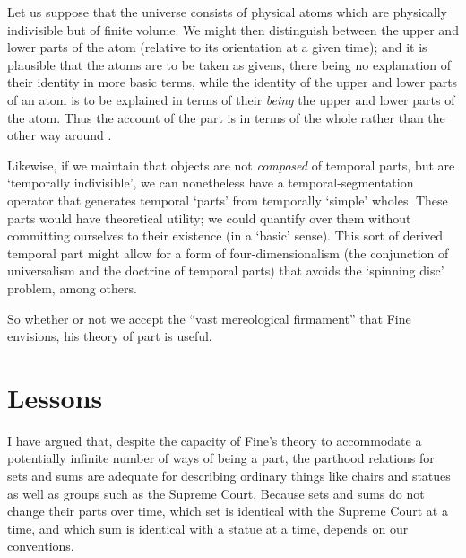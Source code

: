 \documentclass[11pt]{article}
\newenvironment{squote}{%
\begin{spacing}{1}
\begin{list}{}{%
\setlength{\labelwidth}{0pt}%
\rightmargin\leftmargin%
}
\item\relax
}{%
\end{list}%
\end{spacing}
}
\begin{document}
\begin{spacing}{1.5}
\begin{squote}
Let us suppose that the universe consists of physical atoms which are
physically indivisible but of finite volume.  We might then
distinguish between the upper and lower parts of the atom (relative to
its orientation at a given time); and it is plausible that the atoms
are to be taken as givens, there being no explanation of their
identity in more basic terms, while the identity of the upper and
lower parts of an atom is to be explained in terms of their {\em
  being} the upper and lower parts of the atom.  Thus the account of
the part is in terms of the whole rather than the other way around
\citep[585]{fine2010}.
\end{squote}

Likewise, if we maintain that objects are not {\em composed} of
temporal parts, but are `temporally indivisible', we can nonetheless
have a temporal-segmentation operator that generates temporal `parts'
from temporally `simple' wholes.  These parts would have theoretical
utility; we could quantify over them without committing ourselves to
their existence (in a `basic' sense).  This sort of derived temporal
part might allow for a form of four-dimensionalism (the conjunction of
universalism and the doctrine of temporal parts) that avoids the
`spinning disc' problem, among others.

So whether or not we accept the ``vast mereological firmament'' that
Fine envisions, his theory of part is useful.


\section{Lessons}
\label{lessons-p}
I have argued that, despite the capacity of Fine's theory to
accommodate a potentially infinite number of ways of being a part, the
parthood relations for sets and sums are adequate for describing
ordinary things like chairs and statues as well as groups such as the
Supreme Court.  Because sets and sums do not change their parts over
time, which set is identical with the Supreme Court at a time, and
which sum is identical with a statue at a time, depends on our
conventions.


\end{spacing}
\end{document}
